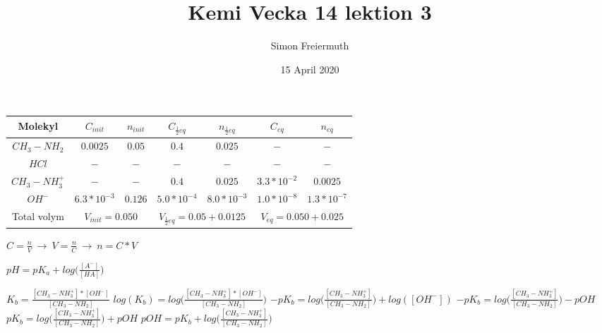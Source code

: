 \documentclass[12pt, letterpaper, twoside]{article}
\title{Kemi Vecka 14 lektion 3}
\author{Simon Freiermuth}
\date{15 April 2020}
\begin{document}
\begin{titlepage}
\maketitle
\end{titlepage}
\begin{flushleft}
\begin{tabular}{ |c|c|c|c|c|c|c| }
\hline
    Molekyl         & $ C_{init} $    & $ n_{init} $ & $ C_{\frac{1}{2}eq} $ & $ n_{\frac{1}{2}eq} $ & $ C_{eq} $      & $ n_{eq} $    \\
\hline
    $ CH_3-NH_2 $   & $ 0.0025 $      & $ 0.05 $     & $ 0.4 $               & $ 0.025 $             & $ - $           & $ - $         \\
\hline
    $ HCl $         & $ - $           & $ - $        & $ - $                 & $ - $                 & $ - $           & $ - $         \\
\hline
    $ CH_3-NH_3^+ $ & $ - $           & $ - $        & $ 0.4 $               & $ 0.025 $             & $ 3.3*10^{-2} $ & $ 0.0025 $    \\
\hline
    $ OH^- $        & $ 6.3*10^{-3} $ & $ 0.126 $    & $ 5.0*10^{-4} $       & $ 8.0*10^{-3} $       & $ 1.0*10^{-8} $ & $ 1.3*10^{-7}$\\
\hline
    Total volym & \multicolumn{2}{c|}{ $ V_{init} = 0.050 $ } & \multicolumn{2}{c|}{ $ V_{\frac{1}{2}eq} = 0.05+0.0125 $ } & \multicolumn{2}{c|}{ $ V_{eq} = 0.050+0.025 $ } \\
\hline
\end{tabular}
\hfill

$ C=\frac{n}{V}\ \rightarrow\ V=\frac{n}{C}\ \rightarrow\ n=C*V $

\hfill \break
$ pH = pK_a + log\Big( \frac{[A^-]}{[HA]} \Big) $

\begin{multicols}{2}
$ K_b = \frac{[CH_3-NH_3^+]*[OH^-]}{[CH_3-NH_2]} $
\newline
\newline
$ log(K_b) = log\Big(\frac{[CH_3-NH_3^+]*[OH^-]}{[CH_3-NH_2]}\Big) $
\newline
\newline
$ -pK_b = log\Big(\frac{[CH_3-NH_3^+]}{[CH_3-NH_2]}\Big)+log([OH^-]) $
\newline
\newline
$ -pK_b = log\Big(\frac{[CH_3-NH_3^+]}{[CH_3-NH_2]}\Big)-pOH $
\newline
\newline
$ pK_b = log\Big(\frac{[CH_3-NH_3^+]}{[CH_3-NH_2]}\Big)+pOH $
\newline
\newline
$ pOH = pK_b+log\Big(\frac{[CH_3-NH_3^+]}{[CH_3-NH_2]}\Big) $
\newline
\columnbreak


\end{multicols}
\end{flushleft}
\end{document}
